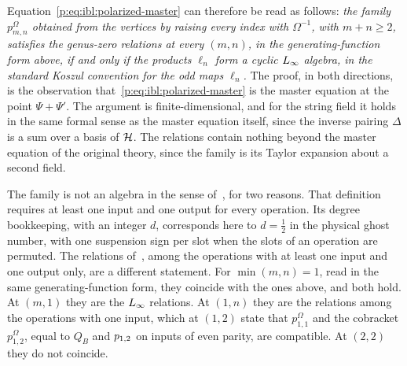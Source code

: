 Equation~\eqref{p:eq:ibl:polarized-master} can therefore be read as follows: \emph{the family $p^{\Omega}_{m, n}$ obtained from the vertices by raising every index with $\Omega^{-1}$, with $m + n \ge 2$, satisfies the genus-zero \IBL{} relations at every $(m, n)$, in the generating-function form above, if and only if the products $\ell_n$ form a cyclic $L_\infty$ algebra, in the standard Koszul convention for the odd maps $\ell_n$.}
The proof, in both directions, is the observation that~\eqref{p:eq:ibl:polarized-master} is the master equation at the point $\Psi + \Psi'$.
The argument is finite-dimensional, and for the string field it holds in the same formal sense as the master equation itself, since the inverse pairing $\Delta$ is a sum over a basis of $\mathcal{H}$.
The relations contain nothing beyond the master equation of the original theory, since the family is its Taylor expansion about a second field.

The family is not an \IBL{} algebra in the sense of~\cite[Def.~2.3]{Cieliebak:2015:HomologicalAlgebraRelated}, for two reasons.
That definition requires at least one input and one output for every operation.
Its degree bookkeeping, with an integer $d$, corresponds here to $d = \tfrac{1}{2}$ in the physical ghost number, with one suspension sign per slot when the slots of an operation are permuted.
The relations of~\cite[Def.~2.3]{Cieliebak:2015:HomologicalAlgebraRelated}, among the operations with at least one input and one output only, are a different statement.
For $\min(m, n) = 1$, read in the same generating-function form, they coincide with the ones above, and both hold.
At $(m, 1)$ they are the $L_\infty$ relations.
At $(1, n)$ they are the relations among the operations with one input, which at $(1, 2)$ state that $p^{\Omega}_{1, 1}$ and the cobracket $p^{\Omega}_{1, 2}$, equal to $Q_B$ and $p_{1,2}$ on inputs of even parity, are compatible.
At $(2, 2)$ they do not coincide.

